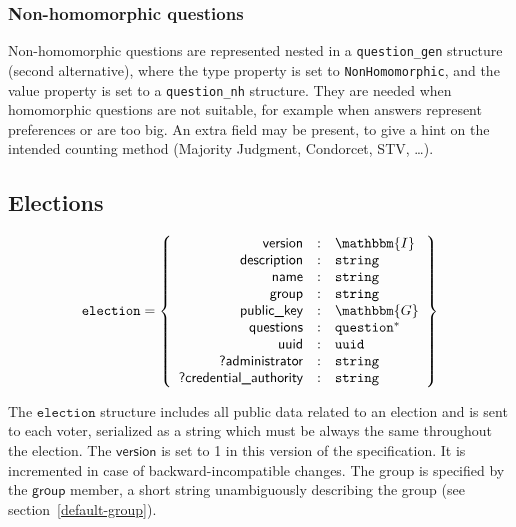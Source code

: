 \documentclass[a4paper]{article}
\newcommand{\G}{\mathbbm{G}}
\newcommand{\I}{\mathbbm{I}}
\newcommand{\jstring}{\texttt{string}}
\newcommand{\election}{\texttt{election}}
\begin{document}
\subsubsection{Non-homomorphic questions}

Non-homomorphic questions are represented nested in a
\texttt{question\_gen} structure (second alternative), where the
\textsf{type} property is set to \verb=NonHomomorphic=, and the
\textsf{value} property is set to a \texttt{question\_nh}
structure. They are needed when homomorphic questions are not
suitable, for example when answers represent preferences or are too
big. An \textsf{extra} field may be present, to give a hint on the
intended counting method (Majority Judgment, Condorcet, STV, \dots).

\subsection{Elections}
\label{elections}

\newcommand{\answer}{\texttt{answer}}
\newcommand{\signature}{\texttt{signature}}
\newcommand{\iproofs}{\textsf{individual\_proofs}}
\newcommand{\oproof}{\textsf{overall\_proof}}
\newcommand{\bproof}{\textsf{blank\_proof}}
\newcommand{\choices}{\textsf{choices}}
\newcommand{\iprove}{\textsf{iprove}}

\begin{gather*}
  \election=\left\{
    \begin{array}{rcl}
      \textsf{version}&:&\I\\
      \textsf{description}&:&\jstring\\
      \textsf{name}&:&\jstring\\
      \textsf{group}&:&\jstring\\
      \textsf{public\_key}&:&\G\\
      \textsf{questions}&:&\texttt{question}^\ast\\
      \textsf{uuid}&:&\texttt{uuid}\\
      \textsf{?administrator}&:&\jstring\\
      \textsf{?credential\_authority}&:&\jstring
    \end{array}
  \right\}
\end{gather*}

The $\election$ structure includes all public data related to an
election and is sent to each voter, serialized as a string which must
be always the same throughout the election. The $\textsf{version}$ is
set to 1 in this version of the specification. It is incremented in
case of backward-incompatible changes. The group is specified by the
$\textsf{group}$ member, a short string unambiguously describing the
group (see section~\ref{default-group}).
\end{document}
